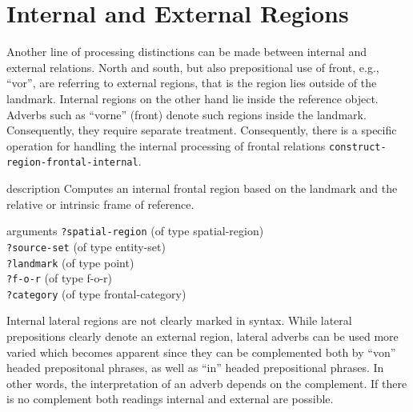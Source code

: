 \section{Internal and External Regions}
Another line of processing distinctions can be made between internal 
and external relations. North and south, but also prepositional use
of front, e.g., ``vor'', are referring to external regions, that is the
region lies outside of the landmark. Internal regions on the other
hand lie inside the reference object. Adverbs such as ``vorne'' (front)
denote such regions inside the landmark. Consequently, they require
separate treatment. Consequently, there is a specific operation
for handling the internal processing of frontal relations 
{\footnotesize\tt construct-region-frontal-internal}.

\begin{explanation}{description}
Computes an internal frontal region based on the landmark
and the relative or intrinsic frame of reference.
\end{explanation}
\begin{explanation}{arguments}
{\footnotesize\verb+?spatial-region+} (of type spatial-region) \\
{\footnotesize\verb+?source-set+} (of type entity-set) \\
{\footnotesize\verb+?landmark+} (of type point)\\
{\footnotesize\verb+?f-o-r+} (of type f-o-r)\\
{\footnotesize\verb+?category+} (of type frontal-category)
\vspace{0.3cm}
\end{explanation}

Internal lateral regions are not clearly marked in syntax. 
While lateral prepositions clearly denote an external region, 
lateral adverbs can be used more varied which becomes apparent
since they can be complemented both by ``von'' headed prepositonal
phrases, as well as ``in'' headed prepositional phrases.
In other words, the interpretation of an adverb depends
on the complement. If there is no complement both readings
internal and external are possible. 

